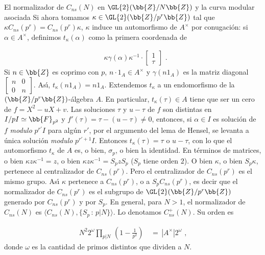 \begin{subsection}{El normalizador de $C_{ns}(N)$ en $\GL{2}(\bb{Z}/N\bb{Z})$%
			y la curva modular asociada}
Si ahora tomamos $\kappa\in\GL{2}(\bb{Z}/p^{r}\bb{Z})$ tal que
$\kappa C_{ns}(p^{r})=C_{ns}(p^{r})\kappa$, $\kappa$ induce un automorfismo de
$A^{\times}$ por conugaci\'{o}n: si $\alpha\in A^{\times}$, definimos
$t_{\kappa}(\alpha)$ como la primera coordenada de

\begin{align*}
 & \kappa\gamma(\alpha)\kappa^{-1}\cdot\begin{bmatrix}1\\ \tau\end{bmatrix}
 \text{ .}
\end{align*}
Si $n\in\bb{Z}$ es coprimo con $p$, $n\cdot 1_{A}\in A^{\times}$ y
$\gamma(n1_{A})$ es la matriz diagonal
\begin{math}
\left[\begin{smallmatrix} n&0\\0&n\end{smallmatrix}\right]
\end{math}.
As\'{\i}, $t_{\kappa}(n1_{A})=n1_{A}$. Extendemos $t_{\kappa}$ a un endomorfismo
de la $(\bb{Z}/p^{r}\bb{Z})$-\'{a}lgebra $A$. En particular,
$t_{\kappa}(\tau)\in A$ tiene que ser un cero de $f=X^{2}-uX+v$. Las soluciones
$\tau$ y $u-\tau$ de $f$ son distintas en $I/pI\simeq\bb{F}_{p^{2}}$ y
$f'(\tau)=\tau-(u-\tau)\not =0$, entonces,
si $\alpha\in I$ es soluci\'{o}n de $f$ \textit{modulo} $p^{r'}I$ para alg\'{u}n
$r'$, por el argumento del lema de Hensel, se levanta a \'{u}nica soluci\'{o}n
\textit{modulo} $p^{r'+1}I$. Entonces $t_{\kappa}(\tau)=\tau$ o $u-\tau$, con lo
que el automorfismo $t_{\kappa}$ de $A$ es, o bien, $\sigma_{p}$, o bien la
identidad. En t\'{e}rminos de matrices, o bien $\kappa z\kappa^{-1}=z$, o bien
$\kappa z\kappa^{-1}=S_{p}zS_{p}$ ($S_{p}$ tiene orden $2$). O bien $\kappa$,
o bien $S_{p}\kappa$, pertenece al centralizador de $C_{ns}(p^{r})$. Pero el
centralizador de $C_{ns}(p^{r})$ es el mismo grupo. As\'{\i}
$\kappa$ pertenece a $C_{ns}(p^{r})$, o a $S_{p}C_{ns}(p^{r})$, es decir que el
normalizador de $C_{ns}(p^{r})$ es el subgrupo de $\GL{2}(\bb{Z}/p^{r}\bb{Z})$
generado por $C_{ns}(p^{r})$ y por $S_{p}$. En general, para $N>1$,
el normalizador de $C_{ns}(N)$ es $\langle C_{ns}(N),\{S_{p}\,:\,p|N\} \rangle$.
Lo denotamos $C_{ns}^{+}(N)$. Su orden es

\begin{align*}
N^{2}2^{\omega}\prod_{p|N}\,\left(1-\frac{1}{p^{2}}\right) &
\,=\,|A^{\times}|2^{\omega}\text{ ,}
\end{align*}
donde $\omega$ es la cantidad de primos distintos que dividen a $N$.


\end{subsection}